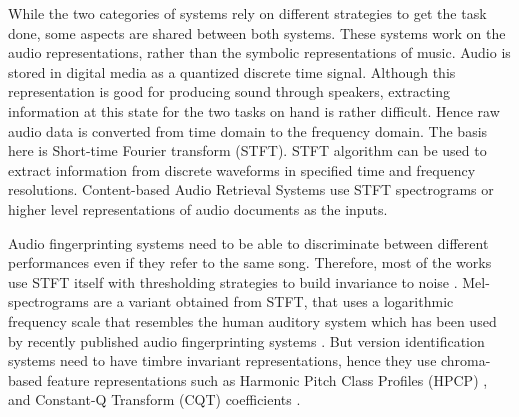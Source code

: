 \documentclass[../main.tex]{subfiles}
\begin{document}
\par
While the two categories of systems rely on different strategies to get the task done, some aspects are shared between both systems. These systems work on the audio representations, rather than the symbolic representations of music. Audio is stored in digital media as a quantized discrete time signal. Although this representation is good for producing sound through speakers, extracting information at this state for the two tasks on hand is rather difficult. Hence raw audio data is converted from time domain to the frequency domain. The basis here is Short-time Fourier transform (\Gls{STFT}).  \Gls{STFT} algorithm can be used to extract information from discrete waveforms in specified time and frequency resolutions. Content-based Audio Retrieval Systems use \gls{STFT} spectrograms or higher level representations of audio documents as the inputs.

\iffalse
Figure \ref{fig:representations} shows some of these representations \cite{book}.

\begin{figure}[H]
    \centering
    \texttt{[image: representations.png]}
    \caption{Various representations for a recording of the chromatic scale played on a real piano. (a) Piano keys representing the chromatic scale. (b) Magnitude spectrogram. (c) Pitch-based log-frequency spectrogram. (d) Chromagram.}
    \label{fig:representations}
\end{figure}
\fi


\par
Audio fingerprinting systems need to be able to discriminate between different performances even if they refer to the same song. Therefore, most of the works use \gls{STFT} itself with thresholding strategies to build invariance to noise \cite{haitsmaHighlyRobustAudio2002,sift,ellisEchoPrintOpenSource2011,wangIndustrialStrengthAudio2003,computer_vision_for_music_identification}. Mel-spectrograms are a variant obtained from \gls{STFT}, that uses a logarithmic frequency scale that resembles the human auditory system which has been used by recently published audio fingerprinting systems \cite{yu_contrastive_2020,baez_suarez_unsupervised_2020}. But version identification systems need to have timbre invariant representations, hence they use chroma-based feature representations such as Harmonic Pitch Class Profiles (\gls{HPCP}) \cite{gomezSongRemainsSame2006,serraChromaBinarySimilarity2008,serraCrossRecurrenceQuantification2009,yesilerAccurateScalableVersion2020}, and Constant-Q Transform (\gls{CQT}) coefficients \cite{yuTemporalPyramidPooling2019,dorasCoverDetectionUsing2019,jiang_yang_chen_2020}.
\end{document}
